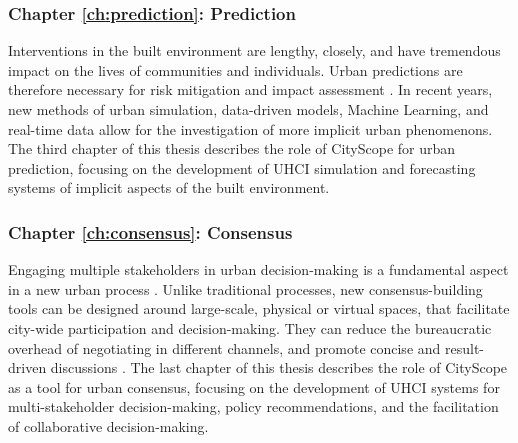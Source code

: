 {{        \subsubsection{Chapter \eqref{ch:prediction}: Prediction}
        {
            Interventions in the built environment are lengthy, closely, and have tremendous impact on the lives of communities and individuals. Urban predictions are therefore necessary for risk mitigation and impact assessment \cite{batty2013new, Glaeser2011, Song2010}. In recent years, new methods of urban simulation, data-driven models, Machine Learning, and real-time data allow for the investigation of more implicit urban phenomenons. The third chapter of this thesis describes the role of CityScope for urban prediction, focusing on the development of UHCI simulation and forecasting systems of implicit aspects of the built environment.
        }

        \subsubsection{Chapter \eqref{ch:consensus}: Consensus}
        {
            Engaging multiple stakeholders in urban decision-making is a fundamental aspect in a new urban process \cite{habitat2016new, banerjee2011companion}. Unlike traditional processes, new consensus-building tools can be designed around large-scale, physical or virtual spaces, that facilitate city-wide participation and decision-making. They can reduce the bureaucratic overhead of negotiating in different channels, and promote concise and result-driven discussions \cite{ben-joseph2001, habitat2016new, Innes2016}.
            The last chapter of this thesis describes the role of CityScope as a tool for urban consensus, focusing on the development of UHCI systems for multi-stakeholder decision-making, policy recommendations, and the facilitation of collaborative decision-making.
        }


}}
